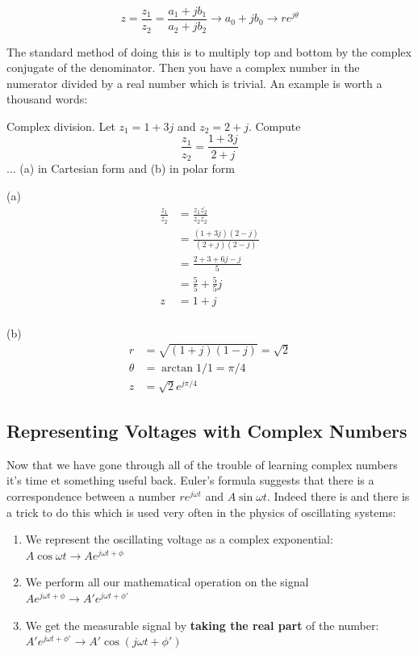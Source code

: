 \documentclass{tufte-book}
\begin{document}
$$
z = \frac{z_1}{z_2} = \frac{a_1+jb_1}{a_2+jb_2} \rightarrow a_0 +jb_0 \rightarrow re^{j\theta} 
$$

The standard method of doing this is to multiply top and bottom by the complex conjugate of the denominator. Then you have a complex number in the numerator divided by a real number which is trivial. An example is worth a thousand words:

\begin{myexample}[label = ex:its_complicateder]{Complex division.}
Let $z_1 = 1 + 3j$ and $z_2 = 2 + j$. Compute 
$$
\frac{z_1}{z_2} = \frac{1 + 3j}{2 + j}
$$
\noindent... (a) in Cartesian form and (b) in polar form

(a) \begin{align*}
\frac{z_1}{z_2}  &= \frac{z_1\bar{z_2}}{z_2\bar{z_2}} \\
& = \frac{\left(1+3j\right)\left(2-j\right)}{\left(2+j\right)\left(2-j\right)} \\
&=  \frac{2+3 + 6j-j}{5} \\
&= \frac{5}{5} + \frac{5}{5}j \\
z &= 1+j
\end{align*}
\\
(b)\begin{align*}
r &= \sqrt{(1+j)(1-j)} = \sqrt{2} \\
\theta &= \arctan{1/1} = \pi/4 \\
z &= \sqrt{2}e^{j\pi/4}
\end{align*}
\end{myexample}

\subsection{Representing Voltages with Complex Numbers}
Now that we have gone through all of the trouble of learning complex numbers it's time et something useful back. Euler's formula suggests that there is a correspondence between a number $re^{j\omega t}$ and $A\sin\omega t$. Indeed there is and there is a trick to do this which is used very often in the physics of oscillating systems:

\begin{enumerate}
\item We represent the oscillating voltage as a complex exponential: $A\cos\omega t \rightarrow Ae^{j\omega t + \phi}$
\item We perform all our mathematical operation on the signal $Ae^{j\omega t + \phi}\rightarrow A'e^{j\omega t +\phi'}$
\item We get the measurable signal by \textbf{taking the real part} of the number: $A'e^{j\omega t +\phi'} \rightarrow A'\cos(j\omega t +\phi')$
\end{enumerate}
\end{document}
